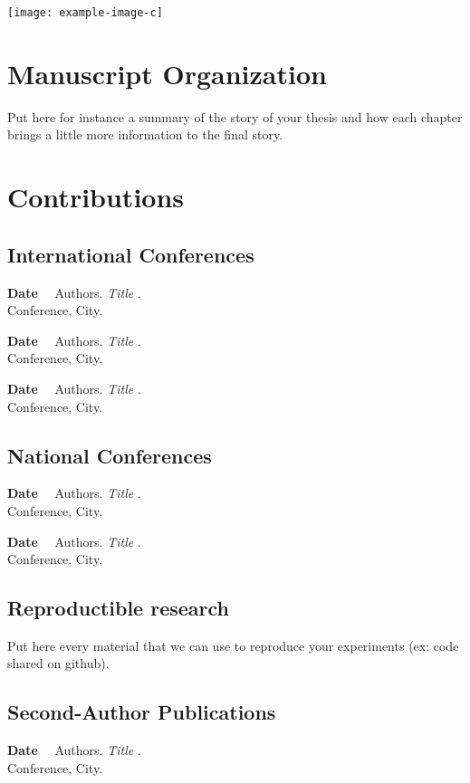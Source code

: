 \centerline{\texttt{[image: example-image-c]}}
\clearpage
\section{Manuscript Organization}

Put here for instance a summary of the story of your thesis and how each chapter brings a little more information to the final story.

\section{Contributions}

\subsection{International Conferences}

\textbf{Date} \ \ Authors. \textit{Title} \cite{a1}. \\ Conference, City.

\textbf{Date} \ \ Authors. \textit{Title} \cite{a2}. \\ Conference, City.

\textbf{Date} \ \ Authors. \textit{Title} \cite{a3}. \\ Conference, City.

\subsection{National Conferences}

\textbf{Date} \ \ Authors. \textit{Title} \cite{a1}. \\ Conference, City.

\textbf{Date} \ \ Authors. \textit{Title} \cite{a2}. \\ Conference, City.

\subsection{Reproductible research}

Put here every material that we can use to reproduce your experiments (ex: code shared on github).

\subsection{Second-Author Publications}

\textbf{Date} \ \ Authors. \textit{Title} \cite{a3}. \\ Conference, City.

